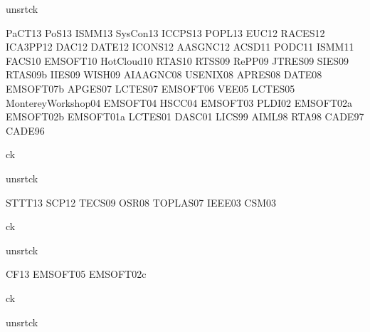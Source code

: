 {unsrtck}

\nocite{conferences}{PaCT13}
\nocite{conferences}{PoS13}
\nocite{conferences}{ISMM13}
\nocite{conferences}{SysCon13}
\nocite{conferences}{ICCPS13}
\nocite{conferences}{POPL13}
\nocite{conferences}{EUC12}
\nocite{conferences}{RACES12}
\nocite{conferences}{ICA3PP12}
\nocite{conferences}{DAC12}
\nocite{conferences}{DATE12}
\nocite{conferences}{ICONS12}
\nocite{conferences}{AASGNC12}
\nocite{conferences}{ACSD11}
\nocite{conferences}{PODC11}
\nocite{conferences}{ISMM11}
\nocite{conferences}{FACS10}
\nocite{conferences}{EMSOFT10}
\nocite{conferences}{HotCloud10}
\nocite{conferences}{RTAS10}
\nocite{conferences}{RTSS09}
\nocite{conferences}{RePP09}
\nocite{conferences}{JTRES09}
\nocite{conferences}{SIES09}
\nocite{conferences}{RTAS09b}
\nocite{conferences}{IIES09}
\nocite{conferences}{WISH09}
\nocite{conferences}{AIAAGNC08}
\nocite{conferences}{USENIX08}
\nocite{conferences}{APRES08}
\nocite{conferences}{DATE08}
\nocite{conferences}{EMSOFT07b}
\nocite{conferences}{APGES07}
\nocite{conferences}{LCTES07}
\nocite{conferences}{EMSOFT06}
\nocite{conferences}{VEE05}
\nocite{conferences}{LCTES05}
\nocite{conferences}{MontereyWorkshop04}
\nocite{conferences}{EMSOFT04}
\nocite{conferences}{HSCC04}
\nocite{conferences}{EMSOFT03}
\nocite{conferences}{PLDI02}
\nocite{conferences}{EMSOFT02a}
\nocite{conferences}{EMSOFT02b}
\nocite{conferences}{EMSOFT01a}
\nocite{conferences}{LCTES01}
\nocite{conferences}{DASC01}
\nocite{conferences}{LICS99}
\nocite{conferences}{AIML98}
\nocite{conferences}{RTA98}
\nocite{conferences}{CADE97}
\nocite{conferences}{CADE96}

{ck}{}


{unsrtck}

\nocite{journals}{STTT13}
\nocite{journals}{SCP12}
\nocite{journals}{TECS09}
\nocite{journals}{OSR08}
\nocite{journals}{TOPLAS07}
\nocite{journals}{IEEE03}
\nocite{journals}{CSM03}

{ck}{}


{unsrtck}

\nocite{invited}{CF13}
\nocite{invited}{EMSOFT05}
\nocite{invited}{EMSOFT02c}

{ck}{}


{unsrtck}

